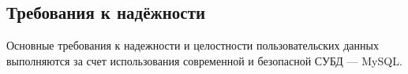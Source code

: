 \documentclass[other-needs.tex]{subfiles}
\begin{document}
\subsection{Требования к надёжности}
\par
Основные требования к надежности и целостности пользовательских данных выполняются 
за счет использования современной и безопасной СУБД --- MySQL.
\end{document}
